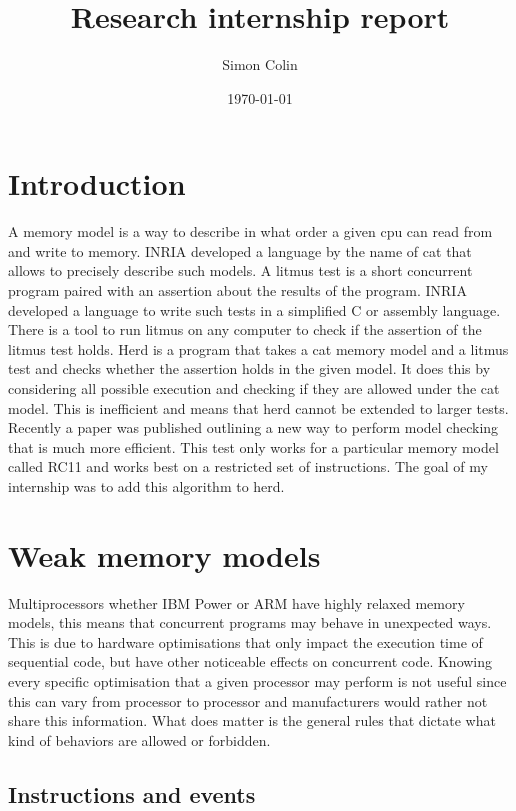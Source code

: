 \documentclass[a4,11pt,dvipsnames]{article}
\title{Research internship report}
\author{Simon Colin}
\date{\today}
\begin{document}
\maketitle


\section{Introduction}
A memory model is a way to describe in what order a given cpu can read from and write to memory. INRIA developed a language by the name of cat that allows to precisely describe such models.
A litmus test is a short concurrent program paired with an assertion about the results of the program. INRIA developed a language to write such tests in a simplified C or assembly language. There is a tool to run litmus on any computer to check if the assertion of the litmus test holds.
Herd is a program that takes a cat memory model and a litmus test and checks whether the assertion holds in the given model. It does this by considering all possible execution and checking if they are allowed under the cat model. This is inefficient and means that herd cannot be extended to larger tests.
Recently a paper was published outlining a new way to perform model checking that is much more efficient. This test only works for a particular memory model called RC11 and works best on a restricted set of instructions. The goal of my internship was to add this algorithm to herd.

\section{Weak memory models}

Multiprocessors whether IBM Power or ARM have highly relaxed memory models, this means that concurrent programs may behave in unexpected ways. This is due to hardware optimisations that only impact the execution time of sequential code, but have other noticeable effects on concurrent code. Knowing every specific optimisation that a given processor may perform is not useful since this can vary from processor to processor and manufacturers would rather not share this information. What does matter is the general rules that dictate what kind of behaviors are allowed or forbidden.

\subsection{Instructions and events}
\end{document}
